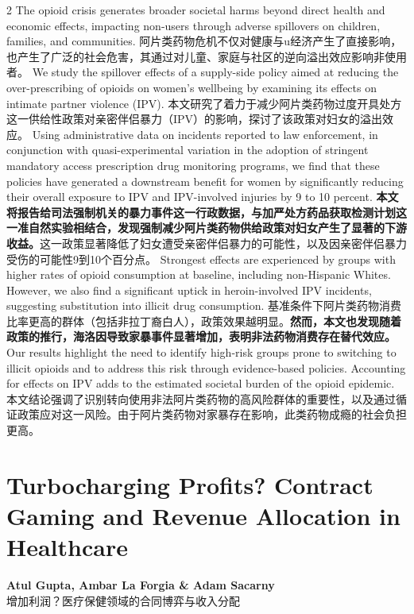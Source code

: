 \documentclass[cn,hazy,blue,14pt,screen]{elegantnote}
\begin{document}
\begin{paracol}{2}
	The opioid crisis generates broader societal harms beyond direct health and economic effects, impacting non-users through adverse spillovers on children, families, and communities. 
	\switchcolumn
	阿片类药物危机不仅对健康与u经济产生了直接影响，也产生了广泛的社会危害，其通过对儿童、家庭与社区的逆向溢出效应影响非使用者。
	\switchcolumn*
	We study the spillover effects of a supply-side policy aimed at reducing the over-prescribing of opioids on women’s wellbeing by examining its effects on intimate partner violence (IPV). 
	\switchcolumn
	本文研究了着力于减少阿片类药物过度开具处方这一供给性政策对亲密伴侣暴力（IPV）的影响，探讨了该政策对妇女的溢出效应。
	\switchcolumn*
	Using administrative data on incidents reported to law enforcement, in conjunction with quasi-experimental variation in the adoption of stringent mandatory access prescription drug monitoring programs, we find that these policies have generated a downstream benefit for women by significantly reducing their overall exposure to IPV and IPV-involved injuries by 9 to 10 percent. 
	\switchcolumn
	\textbf{本文将报告给司法强制机关的暴力事件这一行政数据，与加严处方药品获取检测计划这一准自然实验相结合，发现强制减少阿片类药物供给政策对妇女产生了显著的下游收益。}这一政策显著降低了妇女遭受亲密伴侣暴力的可能性，以及因亲密伴侣暴力受伤的可能性9到10个百分点。
	\switchcolumn*
	Strongest effects are experienced by groups with higher rates of opioid consumption at baseline, including non-Hispanic Whites. However, we also find a significant uptick in heroin-involved IPV incidents, suggesting substitution into illicit drug consumption.
	\switchcolumn
	基准条件下阿片类药物消费比率更高的群体（包括非拉丁裔白人），政策效果越明显。\textbf{然而，本文也发现随着政策的推行，海洛因导致家暴事件显著增加，表明非法药物消费存在替代效应。}
	\switchcolumn*
	Our results highlight the need to identify high-risk groups prone to switching to illicit opioids and to address this risk through evidence-based policies. Accounting for effects on IPV adds to the estimated societal burden of the opioid epidemic.
	\switchcolumn
	本文结论强调了识别转向使用非法阿片类药物的高风险群体的重要性，以及通过循证政策应对这一风险。由于阿片类药物对家暴存在影响，此类药物成瘾的社会负担更高。
	
\end{paracol}

\section{Turbocharging Profits? Contract Gaming and Revenue Allocation in Healthcare}
\begin{center}
	\textbf{Atul Gupta, Ambar La Forgia \& Adam Sacarny}\\
	增加利润？医疗保健领域的合同博弈与收入分配
\end{center}
\end{document}
